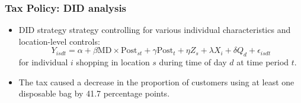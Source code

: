 \documentclass[dvipdfmx,11pt]{beamer}
\begin{document}
\begin{frame}\frametitle{Tax Policy: DID analysis}
  \begin{itemize}
    \item DID strategy strategy controlling for various individual characteristics and location-level controls:
    \[
    Y_{isdt} = \alpha + \beta \text{MD} \times \text{Post}_{st} + \gamma \text{Post}_{t} + \eta Z_s + \lambda X_i + \delta Q_d + \epsilon_{isdt}
    \]
    for individual $i$ shopping in location $s$ during time of day $d$ at time period $t$.
    \item The tax caused a decrease in the proportion of customers using at least one disposable bag by 41.7 percentage points.
  \end{itemize}
\end{frame}
\end{document}
